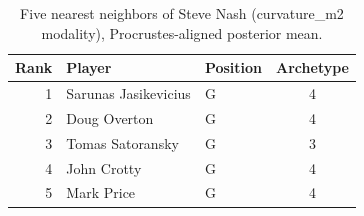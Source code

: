 \begin{table}[htbp]
  \centering\small
  \begin{tabular}{rllc}
    \toprule
    Rank & Player & Position & Archetype \\
    \midrule
    1 & Sarunas Jasikevicius & G & 4 \\
    2 & Doug Overton & G & 4 \\
    3 & Tomas Satoransky & G & 3 \\
    4 & John Crotty & G & 4 \\
    5 & Mark Price & G & 4 \\
    \bottomrule
  \end{tabular}
  \caption{Five nearest neighbors of Steve Nash (curvature_m2 modality), Procrustes-aligned posterior mean.}
  \label{tab:Steve_Nash_neighbors_curvature_m2}
\end{table}

